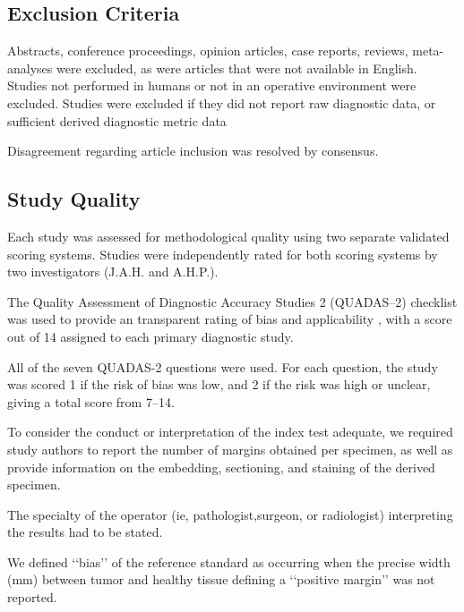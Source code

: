 \subsection{Exclusion Criteria}

Abstracts, conference proceedings, opinion articles, case reports, reviews, meta-analyses were excluded, as were articles that were not available in English.
Studies not performed in humans or not in an operative environment were excluded. 
Studies were excluded if they did not report raw diagnostic data, or sufficient derived diagnostic metric data 

Disagreement regarding article inclusion was resolved by consensus.

\subsection{Study Quality}

Each study was assessed for methodological quality using two separate validated scoring systems.
Studies were independently rated for both scoring systems by two investigators (J.A.H. and A.H.P.).

The Quality Assessment of Diagnostic Accuracy Studies 2 (QUADAS--2) checklist was used to provide an transparent rating of bias and applicability \cite{whitingQUADAS2RevisedTool2011}, with a score out of 14 assigned to each primary diagnostic study.

All of the seven QUADAS-2 questions were used.
For each question, the study was scored 1 if the risk of bias was low, and 2 if the risk was high or unclear, giving a total score from 7--14.







To consider the conduct or interpretation of the index test adequate, we required study authors to report the number of margins obtained per specimen, as well as provide information on the embedding, sectioning, and staining of the derived specimen. 

The specialty of the operator (ie, pathologist,surgeon, or radiologist) interpreting the results had to be stated. 

We defined ‘‘bias’’ of the reference standard as occurring when the precise width (mm) between tumor and healthy tissue defining a ‘‘positive margin’’ was not reported. 

